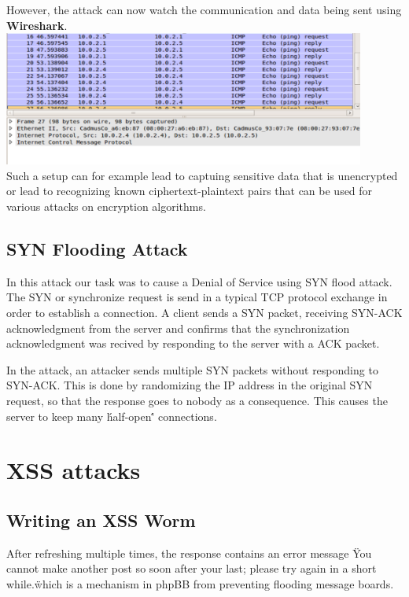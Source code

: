\documentclass[12pt, a4paper, pdflatex]{article}
\begin{document}
However, the attack can now watch the communication and data being sent using \textbf{Wireshark}.\\

\includegraphics[width=450px]{gfx/imcp-shark}\\

Such a setup can for example lead to captuing sensitive data that is unencrypted or lead to recognizing known ciphertext-plaintext pairs that can be used for various attacks on encryption algorithms.




\subsection{SYN Flooding Attack}

In this attack our task was to cause a Denial of Service using SYN flood attack. The SYN or synchronize request is send in a typical TCP protocol exchange in order to establish a connection. A client sends a SYN packet, receiving SYN-ACK acknowledgment from the server and confirms that the synchronization acknowledgment was recived by responding to the server with a ACK packet.

In the attack, an attacker sends multiple SYN packets without responding to SYN-ACK. This is done by randomizing the IP address in the original SYN request, so that the response goes to nobody as a consequence. This causes the server to keep many \'half-open\'' connections.


\section{XSS attacks}

\subsection{Writing an XSS Worm}

After refreshing multiple times, the response contains an error message \"You cannot make another post so soon after your last; please try again in a short while.\" which is a mechanism in phpBB from preventing flooding message boards.
\end{document}
